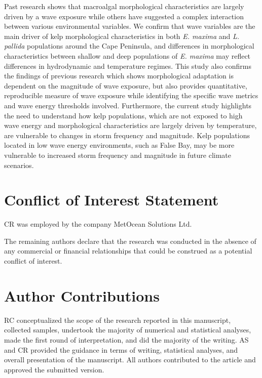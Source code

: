 \documentclass[
  a4paper,
]{article}
\begin{document}
Past research shows that macroalgal morphological characteristics are
largely driven by a wave exposure while others have suggested a complex
interaction between various environmental variables. We confirm that
wave variables are the main driver of kelp morphological characteristics
in both \emph{E. maxima} and \emph{L. pallida} populations around the
Cape Peninsula, and differences in morphological characteristics between
shallow and deep populations of \emph{E. maxima} may reflect differences
in hydrodynamic and temperature regimes. This study also confirms the
findings of previous research which shows morphological adaptation is
dependent on the magnitude of wave exposure, but also provides
quantitative, reproducible measure of wave exposure while identifying
the specific wave metrics and wave energy thresholds involved.
Furthermore, the current study highlights the need to understand how
kelp populations, which are not exposed to high wave energy and
morphological characteristics are largely driven by temperature, are
vulnerable to changes in storm frequency and magnitude. Kelp populations
located in low wave energy environments, such as False Bay, may be more
vulnerable to increased storm frequency and magnitude in future climate
scenarios.

\hypertarget{conflict-of-interest-statement}{%
\section{Conflict of Interest
Statement}\label{conflict-of-interest-statement}}

CR was employed by the company MetOcean Solutions Ltd.

The remaining authors declare that the research was conducted in the
absence of any commercial or financial relationships that could be
construed as a potential conflict of interest.

\hypertarget{author-contributions}{%
\section{Author Contributions}\label{author-contributions}}

RC conceptualized the scope of the research reported in this manuscript,
collected samples, undertook the majority of numerical and statistical
analyses, made the first round of interpretation, and did the majority
of the writing. AS and CR provided the guidance in terms of writing,
statistical analyses, and overall presentation of the manuscript. All
authors contributed to the article and approved the submitted version.
\end{document}
